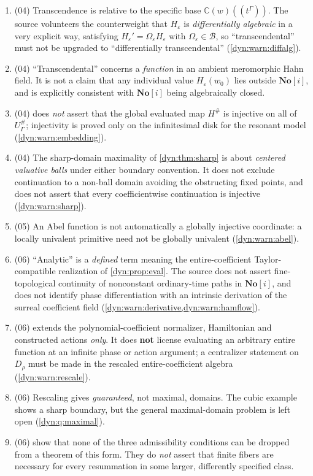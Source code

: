 \documentclass[11pt,letterpaper]{article}
\theoremstyle{definition}
\theoremstyle{remark}
\newcommand{\C}{\mathbb C}
\newcommand{\No}{\mathbf{No}}
\newcommand{\BB}{\mathscr B}
\newcommand{\Li}{\mathcal L}
\newcommand{\eps}{\varepsilon}
\numberwithin{equation}{section}
\begin{document}
\begin{enumerate}[label=\textbf{N\arabic*.},leftmargin=3.2em,start=31]
$\Li^{-1}$ to an arbitrary analytic function can involve infinitely many of
its ordinary Taylor coefficients, and only polynomial input makes each
requested coefficient a finite exact algebraic calculation
(\cref{dyn:warn:finitedep}).
\item (04) Transcendence is relative to the specific base
$\C(w)((t^{\Gamma}))$. The source volunteers the counterweight that
$H_\eps$ is \emph{differentially algebraic} in a very explicit way,
satisfying $H_\eps'=\Omega_\eps H_\eps$ with $\Omega_\eps\in\BB$, so
``transcendental'' must not be upgraded to ``differentially
transcendental'' (\cref{dyn:warn:diffalg}).
\item (04) ``Transcendental'' concerns a \emph{function} in an ambient
meromorphic Hahn field. It is not a claim that any individual value
$H_\eps(w_0)$ lies outside $\No[i]$, and is explicitly consistent with
$\No[i]$ being algebraically closed.
\item (04)  does \emph{not} assert that the global
evaluated map $H^{\#}$ is injective on all of $U^{\#}_\Gamma$; injectivity
is proved only on the infinitesimal disk for the resonant model
(\cref{dyn:warn:embedding}).
\item (04) The sharp-domain maximality of \cref{dyn:thm:sharp} is about
\emph{centered valuative balls} under either boundary convention. It does
not exclude continuation to a non-ball domain avoiding the obstructing
fixed points, and does not assert that every coefficientwise continuation
is injective (\cref{dyn:warn:sharp}).
\item (05) An Abel function is not automatically a globally injective
coordinate: a locally univalent primitive need not be globally univalent
(\cref{dyn:warn:abel}).
\item (06) ``Analytic'' is a \emph{defined} term meaning the
entire-coefficient Taylor-compatible realization of
\cref{dyn:prop:eval}. The source does not assert fine-topological
continuity of nonconstant ordinary-time paths in $\No[i]$, and does not
identify phase differentiation with an intrinsic derivation of the surreal
coefficient field (\cref{dyn:warn:derivative,dyn:warn:hamflow}).
\item (06)  extends the polynomial-coefficient
normalizer, Hamiltonian and constructed actions \emph{only}. It does
\textbf{not} license evaluating an arbitrary entire function at an infinite
phase or action argument; a centralizer statement on $D_\rho$ must be made
in the rescaled entire-coefficient algebra
(\cref{dyn:warn:rescale}).
\item (06) Rescaling gives \emph{guaranteed}, not maximal, domains. The
cubic example shows a sharp boundary, but the general maximal-domain
problem is left open (\cref{dyn:q:maximal}).
\item (06)  show that none of the
three admissibility conditions can be dropped from a theorem of this form.
They do \emph{not} assert that finite fibers are necessary for every
resummation in some larger, differently specified class.
\end{enumerate}
\end{document}
